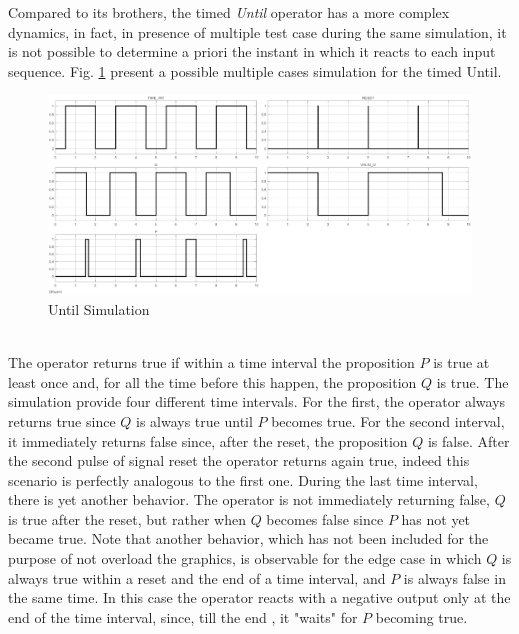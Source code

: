 \par Compared to its brothers, the timed \textit{Until} operator has a more complex dynamics, in fact, in presence of multiple test case during the same simulation, it is not possible to determine a priori the instant in which it reacts to each input sequence. Fig. \ref{fig:testunt} present a possible multiple cases simulation for the timed Until.
\begin{figure}[!h]
	\centering
    \includegraphics[width=\textwidth]{Figs/testunt.eps}
    \caption{Until Simulation}
    \label{fig:testunt}
\end{figure}
\noindent
\\
The operator returns true if within a time interval the proposition $P$ is true at least once and, for all the time before this happen, the proposition $Q$ is true. The simulation provide four different time intervals. For the first, the operator always returns true since $Q$ is always true until $P$ becomes true. For the second interval, it immediately returns false since, after the reset, the proposition $Q$ is false. After the second pulse of signal reset the operator returns again true, indeed this scenario is perfectly analogous to the first one. During the last time interval, there is yet another behavior. The operator is not immediately returning false, $Q$ is true after the reset, but rather when $Q$ becomes false since $P$ has not yet became true. Note that another behavior, which has not been included for the purpose of not overload the graphics, is observable for the edge case in which $Q$ is always true within a reset and the end of a time interval, and $P$ is always false in the same time. In this case the operator reacts with a negative output only at the end of the time interval, since, till the end , it "waits" for $P$ becoming true.
